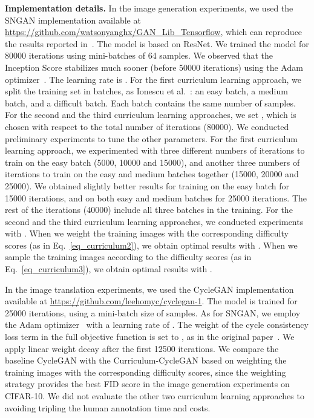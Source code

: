 \documentclass[10pt,twocolumn,letterpaper]{article}
\begin{document}
\noindent 
{\bf Implementation details.}
In the image generation experiments, we used the SNGAN implementation available at \url{https://github.com/watsonyanghx/GAN\_Lib\_Tensorflow}, which can reproduce the results reported in~\cite{Miyato-ICLR-2018}. The model is based on ResNet. We trained the model for 80000 iterations using mini-batches of 64 samples. We observed that the Inception Score stabilizes much sooner (before 50000 iterations) using the Adam optimizer~\cite{Kingma-ICLR-2015}. The learning rate is . For the first curriculum learning approach, we split the training set in  batches, as Ionescu et al.~\cite{Ionescu-CVPR-2016}: an easy batch, a medium batch, and a difficult batch. Each batch contains the same number of samples. For the second and the third curriculum learning approaches, we set , which is chosen with respect to the total number of iterations (80000). We conducted preliminary experiments to tune the other parameters. For the first curriculum learning approach, we experimented with three different numbers of iterations to train on the easy batch (5000, 10000 and 15000), and another three numbers of iterations to train on the easy and medium batches together (15000, 20000 and 25000). We obtained slightly better results for training on the easy batch for 15000 iterations, and on both easy and medium batches for 25000 iterations. The rest of the iterations (40000) include all three batches in the training. For the second and the third curriculum learning approaches, we conducted experiments with . When we weight the training images with the corresponding difficulty scores (as in Eq.~\eqref{eq_curriculum2}), we obtain optimal results with . When we sample the training images according to the difficulty scores (as in Eq.~\eqref{eq_curriculum3}), we obtain optimal results with .

In the image translation experiments, we used the CycleGAN implementation available at \url{https://github.com/leehomyc/cyclegan-1}. The model is trained for 25000 iterations, using a mini-batch size of  samples. As for SNGAN, we employ the Adam optimizer~\cite{Kingma-ICLR-2015} with a learning rate of . The weight of the cycle consistency loss term in the full objective function is set to , as in the original paper~\cite{Zhu-ICCV-2017}. We apply linear weight decay after the first 12500 iterations. We compare the baseline CycleGAN with the Curriculum-CycleGAN based on weighting the training images with the corresponding difficulty scores, since the weighting strategy provides the best FID score in the image generation experiments on CIFAR-10. We did not evaluate the other two curriculum learning approaches to avoiding tripling the human annotation time and costs.
\end{document}
